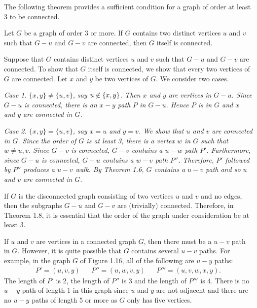 The following theorem provides a sufficient condition for a graph of order at least 3 to be connected.

\begin{thm}
Let $G$ be a graph of order 3 or more. If $G$ contains two distinct vertices $u$ and $v$ such that $G-u$ and $G-v$ are connected, then $G$ itself is connected.
\end{thm}

\begin{pf}
Suppose that $G$ contains distinct vertices $u$ and $v$ such that $G-u$ and $G-v$ are connected. To show that $G$ itself is connected, we show that every two vertices of $G$ are connected. Let $x$ and $y$ be two vertices of $G$. We consider two cases.

\it{Case 1. $\{x,y\} \neq \{u,v\}$, say $u \centernot\in \{x,y\}$.} Then $x$ and $y$ are vertices in $G-u$. Since $G-u$ is connected, there is an $x-y$ path $P$ in $G-u$. Hence $P$ is in $G$ and $x$ and $y$ are connected in $G$.

\it{Case 2. $\{x,y\} = \{u,v\}$, say $x = u$ and $y = v$.} We show that $u$ and $v$ are connected in $G$. Since the order of $G$ is at least 3, there is a vertex $w$ in $G$ such that $w \neq u,v$. Since $G-v$ is connected, $G-v$ contains a $u-w$ path $P'$. Furthermore, since $G-u$ is connected, $G-u$ contains a $w-v$ path $P''$. Therefore, $P'$ followed by $P''$ produces a $u-v$ walk. By Theorem 1.6, $G$ contains a $u-v$ path and so $u$ and $v$ are connected in $G$.
\end{pf}

If $G$ is the disconnected graph consisting of two vertices $u$ and $v$ and no edges, then the subgraphs $G-u$ and $G-v$ are (trivially) connected. Therefore, in Theorem 1.8, it is essential that the order of the graph under consideration be at least 3.

If $u$ and $v$ are vertices in a connected graph $G$, then there must be a $u-v$ path in $G$. However, it is quite possible that $G$ contains several $u-v$ paths. For example, in the graph $G$ of Figure 1.16, all of the following are $u-y$ paths:
\begin{align*}
P' = (u,v,y) && P'' = (u,w,v,y) && P''' = (u,v,w,x,y).
\end{align*}
The length of $P'$ is 2, the length of $P''$ is 3 and the length of $P'''$ is 4. There is no $u-y$ path of length 1 in this graph since $u$ and $y$ are not adjacent and there are no $u-y$ paths of length 5 or more as $G$ only has five vertices.

